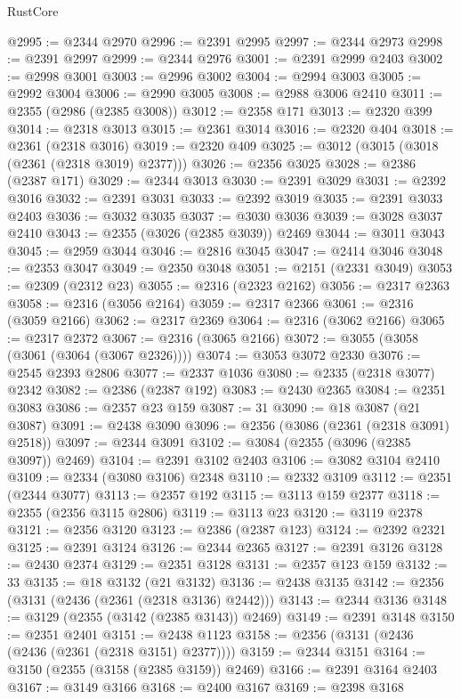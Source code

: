 \begin{lexlean}{RustCore}
\begin{coremodule}
@2995 := @2344 @2970
@2996 := @2391 @2995
@2997 := @2344 @2973
@2998 := @2391 @2997
@2999 := @2344 @2976
@3001 := @2391 @2999 @2403
@3002 := @2998 @3001
@3003 := @2996 @3002
@3004 := @2994 @3003
@3005 := @2992 @3004
@3006 := @2990 @3005
@3008 := @2988 @3006 @2410
@3011 := @2355 (@2986 (@2385 @3008))
@3012 := @2358 @171
@3013 := @2320 @399
@3014 := @2318 @3013
@3015 := @2361 @3014
@3016 := @2320 @404
@3018 := @2361 (@2318 @3016)
@3019 := @2320 @409
@3025 := @3012 (@3015 (@3018 (@2361 (@2318 @3019) @2377)))
@3026 := @2356 @3025
@3028 := @2386 (@2387 @171)
@3029 := @2344 @3013
@3030 := @2391 @3029
@3031 := @2392 @3016
@3032 := @2391 @3031
@3033 := @2392 @3019
@3035 := @2391 @3033 @2403
@3036 := @3032 @3035
@3037 := @3030 @3036
@3039 := @3028 @3037 @2410
@3043 := @2355 (@3026 (@2385 @3039)) @2469
@3044 := @3011 @3043
@3045 := @2959 @3044
@3046 := @2816 @3045
@3047 := @2414 @3046
@3048 := @2353 @3047
@3049 := @2350 @3048
@3051 := @2151 (@2331 @3049)
@3053 := @2309 (@2312 @23)
@3055 := @2316 (@2323 @2162)
@3056 := @2317 @2363
@3058 := @2316 (@3056 @2164)
@3059 := @2317 @2366
@3061 := @2316 (@3059 @2166)
@3062 := @2317 @2369
@3064 := @2316 (@3062 @2166)
@3065 := @2317 @2372
@3067 := @2316 (@3065 @2166)
@3072 := @3055 (@3058 (@3061 (@3064 (@3067 @2326))))
@3074 := @3053 @3072 @2330
@3076 := @2545 @2393 @2806
@3077 := @2337 @1036
@3080 := @2335 (@2318 @3077) @2342
@3082 := @2386 (@2387 @192)
@3083 := @2430 @2365
@3084 := @2351 @3083
@3086 := @2357 @23 @159
@3087 := 31
@3090 := @18 @3087 (@21 @3087)
@3091 := @2438 @3090
@3096 := @2356 (@3086 (@2361 (@2318 @3091) @2518))
@3097 := @2344 @3091
@3102 := @3084 (@2355 (@3096 (@2385 @3097)) @2469)
@3104 := @2391 @3102 @2403
@3106 := @3082 @3104 @2410
@3109 := @2334 (@3080 @3106) @2348
@3110 := @2332 @3109
@3112 := @2351 (@2344 @3077)
@3113 := @2357 @192
@3115 := @3113 @159 @2377
@3118 := @2355 (@2356 @3115 @2806)
@3119 := @3113 @23
@3120 := @3119 @2378
@3121 := @2356 @3120
@3123 := @2386 (@2387 @123)
@3124 := @2392 @2321
@3125 := @2391 @3124
@3126 := @2344 @2365
@3127 := @2391 @3126
@3128 := @2430 @2374
@3129 := @2351 @3128
@3131 := @2357 @123 @159
@3132 := 33
@3135 := @18 @3132 (@21 @3132)
@3136 := @2438 @3135
@3142 := @2356 (@3131 (@2436 (@2361 (@2318 @3136) @2442)))
@3143 := @2344 @3136
@3148 := @3129 (@2355 (@3142 (@2385 @3143)) @2469)
@3149 := @2391 @3148
@3150 := @2351 @2401
@3151 := @2438 @1123
@3158 := @2356 (@3131 (@2436 (@2436 (@2361 (@2318 @3151) @2377))))
@3159 := @2344 @3151
@3164 := @3150 (@2355 (@3158 (@2385 @3159)) @2469)
@3166 := @2391 @3164 @2403
@3167 := @3149 @3166
@3168 := @2400 @3167
@3169 := @2398 @3168

\end{coremodule}
\end{lexlean}
